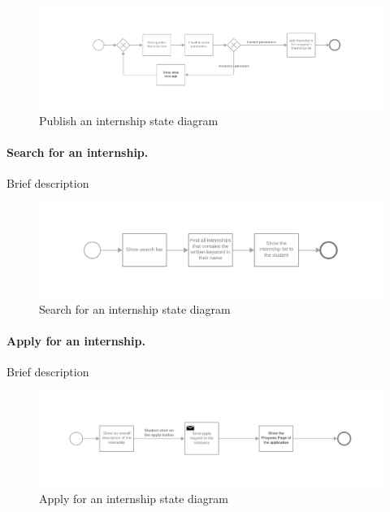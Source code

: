 \begin{figure}[H]
    \begin{center}
        \includegraphics[width=1\linewidth]{RASD/LaTeX/Images/StateDiagrams/publish_an_internship.png}
        \caption{Publish an internship state diagram}
        \label{fig:signup_sd}%
    \end{center}
\end{figure}

\paragraph{Search for an internship.}
Brief description

\begin{figure}[H]
    \begin{center}
        \includegraphics[width=1\linewidth]{RASD/LaTeX/Images/StateDiagrams/search_for_an_internship.png}
        \caption{Search for an internship state diagram}
        \label{fig:signup_sd}%
    \end{center}
\end{figure}

\paragraph{Apply for an internship.}
Brief description

\begin{figure}[H]
    \begin{center}
        \includegraphics[width=1\linewidth]{RASD/LaTeX/Images/StateDiagrams/apply_for_an_internship.png}
        \caption{Apply for an internship state diagram}
        \label{fig:signup_sd}%
    \end{center}
\end{figure}

